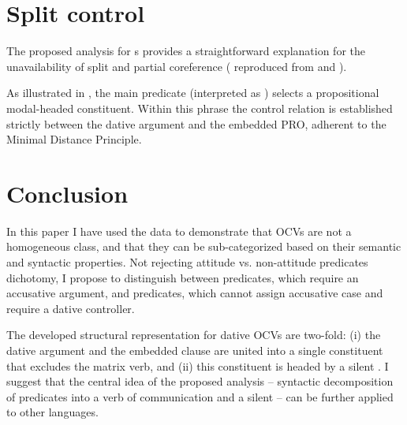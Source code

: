 \documentclass[output=paper,colorlinks,citecolor=brown,newtxmath]{langsci/langscibook}
\begin{document}
\section{Split control}\label{s4}

The proposed analysis for s provides a straightforward explanation for the unavailability of split and partial coreference ( reproduced from  and ).

\ea \label{ex27}
\z
\z

\noindent As illustrated in , the main predicate (interpreted as ) selects a propositional modal-headed constituent. Within this phrase the control relation is established strictly between the dative argument and the embedded PRO, adherent to the Minimal Distance Principle.

\section{Conclusion}\label{s5}

In this paper I have used the  data to demonstrate that OCVs are not a homogeneous class, and that they can be sub-categorized based on their semantic and syntactic properties. Not rejecting  attitude vs. non-attitude predicates dichotomy, I propose to distinguish between  predicates, which require an accusative argument, and  predicates, which cannot assign accusative case and require a dative controller.

The developed structural representation for  dative OCVs are two-fold: (i) the dative argument and the embedded clause are united into a single constituent that excludes the matrix verb, and (ii) this constituent is headed by a silent . I suggest that the central idea of the proposed analysis – syntactic decomposition of  predicates into a verb of communication and a silent  – can be further applied to other languages.
\end{document}
